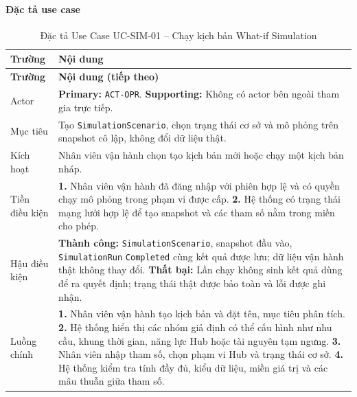 \paragraph{Đặc tả use case}
\small
\begin{longtable}{|L{26mm}|L{118mm}|}
  \caption{Đặc tả Use Case UC-SIM-01 -- Chạy kịch bản What-if Simulation}\label{tab:spec-UC-SIM-01}\\
  \hline
  \centering\arraybackslash\textbf{Trường} & \centering\arraybackslash\textbf{Nội dung}\\
  \hline
  \endfirsthead
  \hline
  \centering\arraybackslash\textbf{Trường} & \centering\arraybackslash\textbf{Nội dung (tiếp theo)}\\
  \hline
  \endhead
  Actor & \textbf{Primary:} \texttt{ACT-OPR}. \textbf{Supporting:} Không có actor bên ngoài tham gia trực tiếp.\\\hline
  Mục tiêu & Tạo \texttt{SimulationScenario}, chọn trạng thái cơ sở và mô phỏng trên snapshot cô lập, không đổi dữ liệu thật.\\\hline
  Kích hoạt & Nhân viên vận hành chọn tạo kịch bản mới hoặc chạy một kịch bản nháp.\\\hline
  Tiền điều kiện &
    \textbf{1.} Nhân viên vận hành đã đăng nhập với phiên hợp lệ và có quyền chạy mô phỏng trong phạm vi được cấp.\newline
    \textbf{2.} Hệ thống có trạng thái mạng lưới hợp lệ để tạo snapshot và các tham số nằm trong miền cho phép.\\\hline
  Hậu điều kiện &
    \textbf{Thành công:} \texttt{SimulationScenario}, snapshot đầu vào, \texttt{SimulationRun} \texttt{Completed} cùng kết quả được lưu; dữ liệu vận hành thật không thay đổi.\newline
    \textbf{Thất bại:} Lần chạy không sinh kết quả dùng để ra quyết định; trạng thái thật được bảo toàn và lỗi được ghi nhận.\\\hline
  Luồng chính &
    \textbf{1.} Nhân viên vận hành tạo kịch bản và đặt tên, mục tiêu phân tích.\newline
    \textbf{2.} Hệ thống hiển thị các nhóm giả định có thể cấu hình như nhu cầu, khung thời gian, năng lực Hub hoặc tài nguyên tạm ngưng.\newline
    \textbf{3.} Nhân viên nhập tham số, chọn phạm vi Hub và trạng thái cơ sở.\newline
    \textbf{4.} Hệ thống kiểm tra tính đầy đủ, kiểu dữ liệu, miền giá trị và các mâu thuẫn giữa tham số.\newline

\end{longtable}
